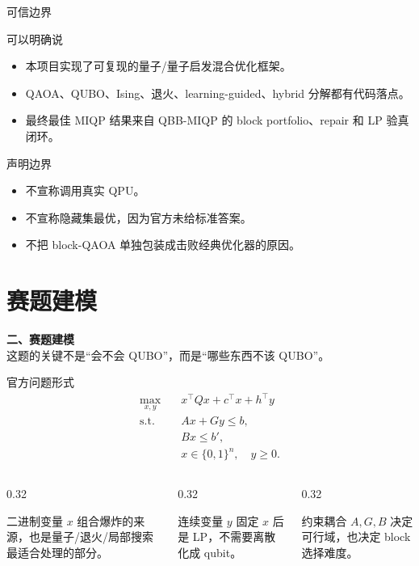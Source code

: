 \documentclass[aspectratio=169]{beamer}
\newcommand{\sectionframe}[2]{
\begin{frame}[plain]
  \vfill
  \begin{center}
    {\Large\bfseries #1}\\[2mm]
    {\small #2}
  \end{center}
  \vfill
\end{frame}
}
\begin{document}
\begin{frame}{可信边界}
\small
\begin{alertblock}{可以明确说}
\begin{itemize}
  \item 本项目实现了可复现的量子/量子启发混合优化框架。
  \item QAOA、QUBO、Ising、退火、learning-guided、hybrid 分解都有代码落点。
  \item 最终最佳 MIQP 结果来自 QBB-MIQP 的 block portfolio、repair 和 LP 验真闭环。
\end{itemize}
\end{alertblock}
\begin{block}{声明边界}
\begin{itemize}
  \item 不宣称调用真实 QPU。
  \item 不宣称隐藏集最优，因为官方未给标准答案。
  \item 不把 block-QAOA 单独包装成击败经典优化器的原因。
\end{itemize}
\end{block}
\end{frame}

\section{赛题建模}
\sectionframe{二、赛题建模}{这题的关键不是“会不会 QUBO”，而是“哪些东西不该 QUBO”。}

\begin{frame}{官方问题形式}
\small
\[
\begin{aligned}
\max_{x,y}\quad & x^\top Qx+c^\top x+h^\top y\\
\text{s.t.}\quad & Ax+Gy\le b,\\
& Bx\le b',\\
& x\in\{0,1\}^n,\quad y\ge 0.
\end{aligned}
\]
\vspace{2mm}
\begin{columns}[T,onlytextwidth]
\begin{column}{0.32\textwidth}
\begin{block}{二进制变量 $x$}
组合爆炸的来源，也是量子/退火/局部搜索最适合处理的部分。
\end{block}
\end{column}
\begin{column}{0.32\textwidth}
\begin{block}{连续变量 $y$}
固定 $x$ 后是 LP，不需要离散化成 qubit。
\end{block}
\end{column}
\begin{column}{0.32\textwidth}
\begin{block}{约束耦合}
$A,G,B$ 决定可行域，也决定 block 选择难度。
\end{block}
\end{column}
\end{columns}
\end{frame}
\end{document}
